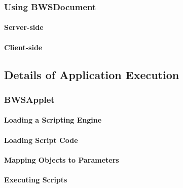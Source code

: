     
     
   \subsubsection{Using BWSDocument}
    \paragraph{Server-side}
    \paragraph{Client-side}
   \subsection{Details of Application Execution}
   
    
    
    \subsubsection{BWSApplet}

     
     
     \paragraph{Loading a Scripting Engine}
     
      
     
     \paragraph{Loading Script Code}
    
      
    
     \paragraph{Mapping Objects to Parameters}
      \label{sec:mapParamObject}
     
      
     
     \paragraph{Executing Scripts}

		  

